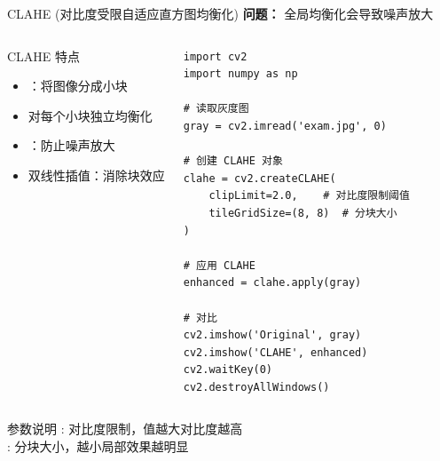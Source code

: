 \begin{frame}[fragile]{CLAHE (对比度受限自适应直方图均衡化)}
    \textbf{问题：} 全局均衡化会导致噪声放大

    \begin{columns}
        \begin{block}{CLAHE 特点}
            \begin{itemize}
                \item {}：将图像分成小块
                \item 对每个小块独立均衡化
                \item {}：防止噪声放大
                \item 双线性插值：消除块效应
            \end{itemize}
        \end{block}

        \begin{lstlisting}[basicstyle=\ttfamily\scriptsize]
import cv2
import numpy as np

# 读取灰度图
gray = cv2.imread('exam.jpg', 0)

# 创建 CLAHE 对象
clahe = cv2.createCLAHE(
    clipLimit=2.0,    # 对比度限制阈值
    tileGridSize=(8, 8)  # 分块大小
)

# 应用 CLAHE
enhanced = clahe.apply(gray)

# 对比
cv2.imshow('Original', gray)
cv2.imshow('CLAHE', enhanced)
cv2.waitKey(0)
cv2.destroyAllWindows()
        \end{lstlisting}
    \end{columns}

    \vspace{0.3cm}
    \begin{alertblock}{参数说明}
        : 对比度限制，值越大对比度越高 \\
        : 分块大小，越小局部效果越明显
    \end{alertblock}
\end{frame}

